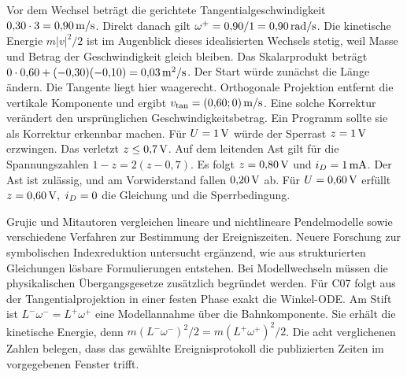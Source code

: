 Vor dem Wechsel beträgt die gerichtete Tangentialgeschwindigkeit \(0{,}30\cdot3=0{,}90\,\mathrm{m/s}\). Direkt danach gilt \(\omega^+=0{,}90/1=0{,}90\,\mathrm{rad/s}\). Die kinetische Energie \(m|v|^2/2\) ist im Augenblick dieses idealisierten Wechsels stetig, weil Masse und Betrag der Geschwindigkeit gleich bleiben.
Das Skalarprodukt beträgt \(0\cdot0{,}60+(-0{,}30)(-0{,}10)=0{,}03\,\mathrm{m^2/s}\). Der Start würde zunächst die Länge ändern. Die Tangente liegt hier waagerecht. Orthogonale Projektion entfernt die vertikale Komponente und ergibt \(v_\mathrm{tan}=(0{,}60;0)\,\mathrm{m/s}\). Eine solche Korrektur verändert den ursprünglichen Geschwindigkeitsbetrag. Ein Programm sollte sie als Korrektur erkennbar machen.
Für \(U=1\,\mathrm{V}\) würde der Sperrast \(z=1\,\mathrm{V}\) erzwingen. Das verletzt \(z\le0{,}7\,\mathrm{V}\). Auf dem leitenden Ast gilt für die Spannungszahlen \(1-z=2(z-0{,}7)\). Es folgt \(z=0{,}80\,\mathrm{V}\) und \(i_D=1\,\mathrm{mA}\). Der Ast ist zulässig, und am Vorwiderstand fallen \(0{,}20\,\mathrm{V}\) ab. Für \(U=0{,}60\,\mathrm{V}\) erfüllt \(z=0{,}60\,\mathrm{V},\ i_D=0\) die Gleichung und die Sperrbedingung.


Grujic und Mitautoren vergleichen lineare und nichtlineare Pendelmodelle sowie verschiedene Verfahren zur Bestimmung der Ereigniszeiten. Neuere Forschung zur symbolischen Indexreduktion untersucht ergänzend, wie aus strukturierten Gleichungen lösbare Formulierungen entstehen. Bei Modellwechseln müssen die physikalischen Übergangsgesetze zusätzlich begründet werden.
Für C07 folgt aus der Tangentialprojektion in einer festen Phase exakt die Winkel-ODE. Am Stift ist \(L^-\omega^-=L^+\omega^+\) eine Modellannahme über die Bahnkomponente. Sie erhält die kinetische Energie, denn \(m(L^-\omega^-)^2/2=m(L^+\omega^+)^2/2\). Die acht verglichenen Zahlen belegen, dass das gewählte Ereignisprotokoll die publizierten Zeiten im vorgegebenen Fenster trifft.


